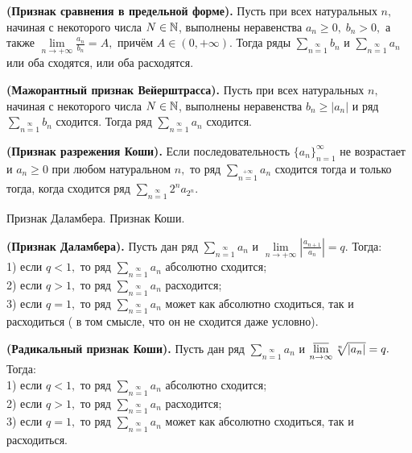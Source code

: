 \begin{theorem} \textbf{(Признак сравнения в предельной форме).}
	Пусть при всех натуральных $n,$
	начиная с некоторого числа $N\in\mathbb{N}$,
	выполнены неравенства $a_n\geq0,\;b_n>0,$
	а также
	$\lim\limits_{n\rightarrow+\infty}\frac{a_n}{b_n}=A,$
	причём $A\in(0, +\infty).$
	Тогда ряды $\sum\limits_{n=1}\limits^{\infty}b_n$
	и $\sum\limits_{n=1}\limits^{\infty}a_n$
	или оба сходятся, или оба расходятся.
\end{theorem}

\begin{lemma} \textbf{(Мажорантный признак Вейерштрасса).}
	Пусть при всех натуральных $n,$
	начиная с некоторого числа $N\in\mathbb{N}$,
	выполнены неравенства $b_n\geq|a_n|$
	и ряд $\sum\limits_{n=1}\limits^{\infty}b_n$
	сходится. Тогда ряд
	$\sum\limits_{n=1}\limits^{\infty}a_n$
	сходится.
\end{lemma}

\begin{theorem}\textbf{(Признак разрежения Коши).}
	Если последовательность
	$\{a_n\}_{n=1}^{\infty}$ не возрастает
	и $a_n\geq0$ при любом натуральном
	$n,$ то ряд
	$\sum\limits_{n=1}\limits^{+\infty}a_n$
	сходится тогда и только тогда, когда
	сходится ряд
	$\sum\limits_{n=1}\limits^{\infty}2^na_{2^n}.$
\end{theorem}

\newpage
\begin{problem}
Признак Даламбера. Признак Коши.
\end{problem}

\begin{theorem} \textbf{(Признак Даламбера).}
	Пусть дан ряд
	$\sum\limits_{n=1}\limits^{\infty}a_n$
	и $\lim\limits_{n\rightarrow+\infty}
		\left|\frac{a_{n+1}}{a_n}\right|=q.$
	Тогда:\\
	1) если $q<1,$ то ряд
	$\sum\limits_{n=1}\limits^{\infty}a_n$
	абсолютно сходится;\\
	2) если $q>1,$ то ряд
	$\sum\limits_{n=1}\limits^{\infty}a_n$
	расходится;\\
	3) если $q=1,$ то ряд
	$\sum\limits_{n=1}\limits^{\infty}a_n$
	может как абсолютно сходиться, так и
	расходиться ( в том смысле, что он
	не сходится даже условно).
\end{theorem}

\begin{theorem} \textbf{(Радикальный признак Коши).}
	Пусть дан ряд
	$\sum\limits_{n=1}\limits^{\infty}a_n$
	и $\operatorname*{\overline{lim}}\limits_{n\rightarrow\infty}
		\sqrt[n]{|a_n|}=q.$
	Тогда:\\
	1) если $q<1,$ то ряд
	$\sum\limits_{n=1}\limits^{\infty}a_n$
	абсолютно сходится;\\
	2) если $q>1,$ то ряд
	$\sum\limits_{n=1}\limits^{\infty}a_n$
	расходится;\\
	3) если $q=1,$ то ряд
	$\sum\limits_{n=1}\limits^{\infty}a_n$
	может как абсолютно сходиться, так и расходиться.
\end{theorem}

